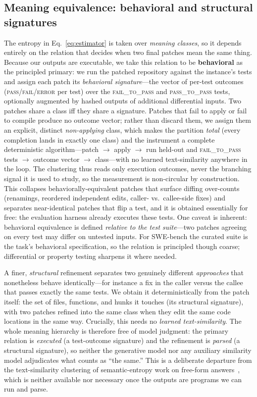 \documentclass[11pt]{article}
\begin{document}
\subsection{Meaning equivalence: behavioral and structural signatures}
\label{sec:instrument}
The entropy in Eq.~\eqref{eq:estimator} is taken over \emph{meaning classes}, so
it depends entirely on the relation that decides when two final patches mean the
same thing. Because our outputs are executable, we take this relation to be
\textbf{behavioral} as the principled primary: we run the patched repository
against the instance's tests and assign each patch its \emph{behavioral
signature}---the vector of per-test outcomes (\textsc{pass}/\textsc{fail}/\textsc{error}
per test) over the \textsc{fail\_to\_pass} and
\textsc{pass\_to\_pass} tests, optionally augmented by hashed outputs of
additional differential inputs. Two patches share a class iff they share a
signature. Patches that fail to apply or fail to compile produce no outcome
vector; rather than discard them, we assign them an explicit, distinct
\emph{non-applying} class, which makes the partition \emph{total} (every
completion lands in exactly one class) and the instrument a complete deterministic
algorithm---patch $\to$ apply $\to$ run held-out and \textsc{fail\_to\_pass} tests
$\to$ outcome vector $\to$ class---with no learned text-similarity anywhere in the
loop. The clustering thus reads only execution outcomes, never the branching
signal it is used to study, so the measurement is non-circular by construction. This collapses behaviorally-equivalent patches that surface diffing
over-counts (renamings, reordered independent edits, caller- vs.\ callee-side
fixes) and separates near-identical patches that flip a test, and it is obtained
essentially for free: the evaluation harness already executes these tests. One
caveat is inherent: behavioral equivalence is defined \emph{relative to the test
suite}---two patches agreeing on every test may differ on untested inputs. For
SWE-bench the curated suite is the task's behavioral specification, so the
relation is principled though coarse; differential or property testing sharpens it
where needed.

A finer, \emph{structural} refinement separates two genuinely different
\emph{approaches} that nonetheless behave identically---for instance a fix in the
caller versus the callee that passes exactly the same tests. We obtain it
deterministically from the patch itself: the set of files, functions, and hunks it
touches (its structural signature), with two patches refined into the same class
when they edit the same code locations in the same way. Crucially, this needs no
\emph{learned text-similarity}. The whole meaning hierarchy is therefore free of
model judgment: the primary relation is \emph{executed} (a test-outcome signature)
and the refinement is \emph{parsed} (a structural signature), so neither the
generative model nor any auxiliary similarity model adjudicates what counts as
``the same.'' This is a deliberate departure from the text-similarity clustering of
semantic-entropy work on free-form answers~\citep{farquhar2024semantic,kuhn2023semantic},
which is neither available nor necessary once the outputs are programs we can run
and parse.
\end{document}
